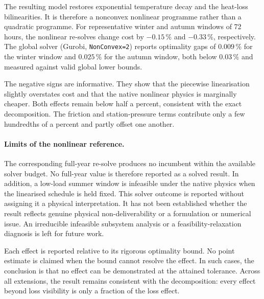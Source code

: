 \documentclass[a4paper,fleqn]{cas-sc}
\begin{document}
The resulting model restores exponential temperature decay and the heat-loss
bilinearities. It is therefore a nonconvex nonlinear programme rather than a
quadratic programme. For representative winter and autumn windows of 72 hours,
the nonlinear re-solves change cost by \(\mathbf{-0.15}\,\%\) and
\(\mathbf{-0.33}\,\%\), respectively. The global solver
(Gurobi, \texttt{NonConvex=2}) reports optimality gaps of \(0.009\,\%\) for the
winter window and \(0.025\,\%\) for the autumn window, both below
\(0.03\,\%\) and measured against valid global lower bounds.

The negative signs are informative. They show that the piecewise linearisation
slightly overstates cost and that the native nonlinear physics is marginally
cheaper. Both effects remain below half a percent, consistent with the exact
decomposition. The friction and station-pressure terms contribute only a few
hundredths of a percent and partly offset one another.

\paragraph{Limits of the nonlinear reference.}
The corresponding full-year re-solve produces no incumbent within the available
solver budget. No full-year value is therefore reported as a solved result.
In addition, a low-load summer window is infeasible under the native physics
when the linearised schedule is held fixed. This solver outcome is reported
without assigning it a physical interpretation. It has not been established
whether the result reflects genuine physical non-deliverability or a formulation
or numerical issue. An irreducible infeasible subsystem analysis or a
feasibility-relaxation diagnosis is left for future work.

Each effect is reported relative to its rigorous optimality bound. No point
estimate is claimed when the bound cannot resolve the effect. In such cases,
the conclusion is that no effect can be demonstrated at the attained tolerance.
Across all extensions, the result remains consistent with the decomposition:
every effect beyond loss visibility is only a fraction of the loss effect.


\end{document}
